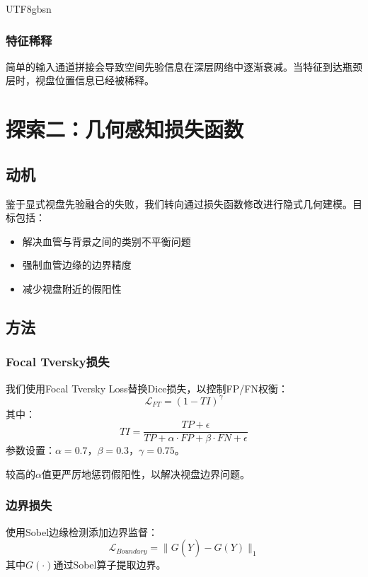 \documentclass[conference]{IEEEtran}
\begin{document}
\begin{CJK}{UTF8}{gbsn}
\subsubsection{特征稀释}
简单的输入通道拼接会导致空间先验信息在深层网络中逐渐衰减。当特征到达瓶颈层时，视盘位置信息已经被稀释。

\section{探索二：几何感知损失函数}

\subsection{动机}

鉴于显式视盘先验融合的失败，我们转向通过损失函数修改进行隐式几何建模。目标包括：
\begin{itemize}
    \item 解决血管与背景之间的类别不平衡问题
    \item 强制血管边缘的边界精度
    \item 减少视盘附近的假阳性
\end{itemize}

\subsection{方法}

\subsubsection{Focal Tversky损失}
我们使用Focal Tversky Loss\cite{salehi2017tversky}替换Dice损失，以控制FP/FN权衡：
\begin{equation}
    \mathcal{L}_{FT} = (1 - TI)^\gamma
\end{equation}
其中：
\begin{equation}
    TI = \frac{TP + \epsilon}{TP + \alpha \cdot FP + \beta \cdot FN + \epsilon}
\end{equation}
参数设置：$\alpha=0.7$，$\beta=0.3$，$\gamma=0.75$。

较高的$\alpha$值更严厉地惩罚假阳性，以解决视盘边界问题。

\subsubsection{边界损失}
使用Sobel边缘检测添加边界监督：
\begin{equation}
    \mathcal{L}_{Boundary} = \|G(\hat{Y}) - G(Y)\|_1
\end{equation}
其中$G(\cdot)$通过Sobel算子提取边界。


\end{CJK}
\end{document}
